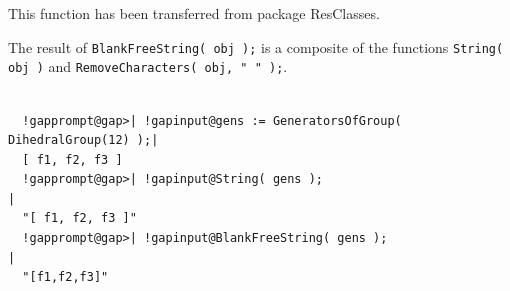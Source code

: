 \documentclass[a4paper,11pt]{report}
\begin{document}
{{{ This function has been transferred from package \textsf{ResClasses}. 

 The result of \texttt{BlankFreeString( obj );} is a composite of the functions \texttt{String( obj )} and \texttt{RemoveCharacters( obj, " " );}. 

 }

 
\begin{Verbatim}[commandchars=!@|,fontsize=\small,frame=single,label=Example]
  
  !gapprompt@gap>| !gapinput@gens := GeneratorsOfGroup( DihedralGroup(12) );|
  [ f1, f2, f3 ]
  !gapprompt@gap>| !gapinput@String( gens );                                |
  "[ f1, f2, f3 ]"
  !gapprompt@gap>| !gapinput@BlankFreeString( gens );                       |
  "[f1,f2,f3]"
  
\end{Verbatim}
 }

 }

         
\end{document}
